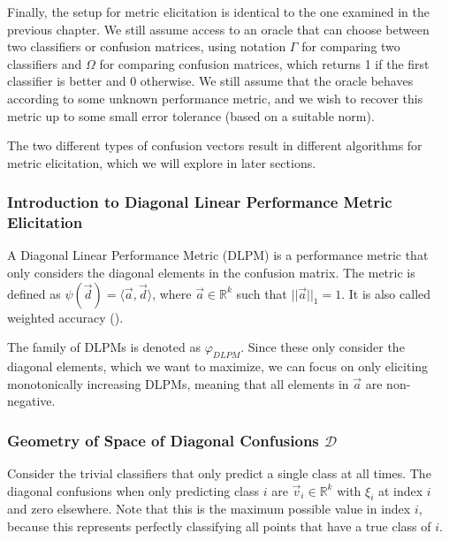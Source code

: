 \documentclass[
  letterpaper,
  numbers=noenddot,
  DIV=11]{scrreprt}
\theoremstyle{plain}
\theoremstyle{definition}
\theoremstyle{plain}
\theoremstyle{remark}
\begin{document}
Finally, the setup for metric elicitation is identical to the one
examined in the previous chapter. We still assume access to an oracle
that can choose between two classifiers or confusion matrices, using
notation \(\Gamma\) for comparing two classifiers and \(\Omega\) for
comparing confusion matrices, which returns 1 if the first classifier is
better and 0 otherwise. We still assume that the oracle behaves
according to some unknown performance metric, and we wish to recover
this metric up to some small error tolerance (based on a suitable norm).

The two different types of confusion vectors result in different
algorithms for metric elicitation, which we will explore in later
sections.

\subsubsection*{Introduction to Diagonal Linear Performance Metric
Elicitation}\label{introduction-to-diagonal-linear-performance-metric-elicitation}

A Diagonal Linear Performance Metric (DLPM) is a performance metric that
only considers the diagonal elements in the confusion matrix. The metric
is defined as \(\psi(\vec{d}) = \langle \vec{a}, \vec{d} \rangle\),
where \(\vec{a} \in \mathbb{R}^k\) such that \(||\vec{a}||_1 = 1\). It
is also called weighted accuracy
().

The family of DLPMs is denoted as \(\varphi_{DLPM}\). Since these only
consider the diagonal elements, which we want to maximize, we can focus
on only eliciting monotonically increasing DLPMs, meaning that all
elements in \(\vec{a}\) are non-negative.

\subsubsection*{\texorpdfstring{Geometry of Space of Diagonal Confusions
\(\mathcal{D}\)}{Geometry of Space of Diagonal Confusions \textbackslash mathcal\{D\}}}\label{geometry-of-space-of-diagonal-confusions-mathcald}

Consider the trivial classifiers that only predict a single class at all
times. The diagonal confusions when only predicting class \(i\) are
\(\vec{v}_i \in \mathbb{R}^k\) with \(\xi_i\) at index \(i\) and zero
elsewhere. Note that this is the maximum possible value in index \(i\),
because this represents perfectly classifying all points that have a
true class of \(i\).
\end{document}
